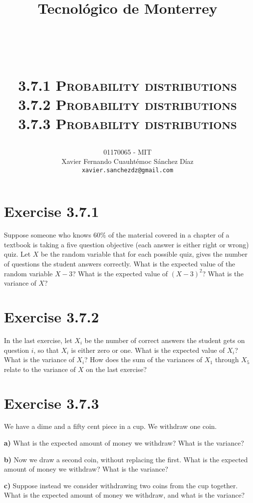 \documentclass[titlepage, letterpaper, fleqn]{article}
\title{
\vspace{1in}
\textbf{Tecnológico de Monterrey} \\
\vspace{0.5in}
\textmd{\mahclass} \\
\large{\textit{\mahteacher}} \\
\vspace{0.5in}
\textsc{\mahtitle}\\
\textsc{3.7.1 Probability distributions}\\
\textsc{3.7.2 Probability distributions}\\
\textsc{3.7.3 Probability distributions}\\
\author{01170065  - MIT \\
Xavier Fernando Cuauhtémoc Sánchez Díaz \\
\texttt{xavier.sanchezdz@gmail.com}}
\date{\mahdate}
}
\newcommand{\spacepls}{\vspace{5mm}}
\begin{document}
\begin{titlepage}
\maketitle
\end{titlepage}

%
%

\section{Exercise 3.7.1}

{\large Suppose someone who knows 60\% of the material covered in a chapter of a textbook is taking a five question objective (each answer is either right or wrong) quiz.
Let \(X\) be the random variable that for each possible quiz,
gives the number of questions the student answers correctly.
What is the expected value of the random variable \(X - 3\)?
What is the expected value of \((X - 3)^2\)?
What is the variance of \(X\)?}

\spacepls

\section{Exercise 3.7.2}

{\large In the last exercise, let \(X_i\) be the number of correct answers the student gets on question \(i\), so that \(X_i\) is either zero or one.
What is the expected value of \(X_i\)?
What is the variance of \(X_i\)?
How does the sum of the variances of \(X_1\) through \(X_5\) relate to the variance of \(X\) on the last exercise?}

\spacepls

\section{Exercise 3.7.3}

{\large We have a dime and a fifty cent piece in a cup.
We withdraw one coin.

\textbf{a)} What is the expected amount of money we withdraw? What is the variance?}

\spacepls

{\large \textbf{b)} Now we draw a second coin, without replacing the first.
What is the expected amount of money we withdraw? What is the variance?}

\spacepls

{\large \textbf{c)} Suppose instead we consider withdrawing two coins from the cup together. What is the expected amount of money we withdraw, and what is the variance?}
\end{document}
